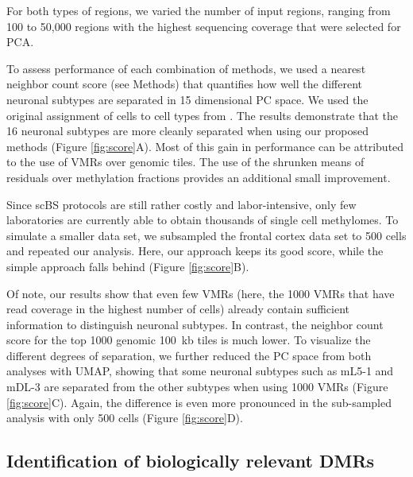\documentclass[twocolumn,10pt]{article}
\begin{document}
For both types of regions, we varied the number of input regions, ranging from 100 to 50,000 regions with the highest sequencing coverage that were selected for PCA.

To assess performance of each combination of methods, we used a nearest neighbor count score (see Methods) that quantifies how well the different neuronal subtypes are separated in 15 dimensional PC space.
We used the original assignment of cells to cell types from \citet{luo2017single}.
The results demonstrate that the 16 neuronal subtypes are more cleanly separated when using our proposed methods (Figure \ref{fig:score}A).
Most of this gain in performance can be attributed to the use of VMRs over genomic tiles.
The use of the shrunken means of residuals over methylation fractions provides an additional small improvement.

Since scBS protocols are still rather costly and labor-intensive, only few laboratories are currently able to obtain thousands of single cell methylomes.
To simulate a smaller data set, we subsampled the frontal cortex data set to 500 cells and repeated our analysis.
Here, our approach keeps its good score, while the simple approach falls behind (Figure \ref{fig:score}B).

Of note, our results show that even few VMRs (here, the 1000 VMRs that have read coverage in the highest number of cells) already contain sufficient information to distinguish neuronal subtypes.
In contrast, the neighbor count score for the top 1000 genomic 100~kb tiles is much lower.
To visualize the different degrees of separation, we further reduced the PC space from both analyses with UMAP, showing that some neuronal subtypes such as mL5-1 and mDL-3 are separated from the other subtypes when using 1000 VMRs (Figure \ref{fig:score}C).
Again, the difference is even more pronounced in the sub-sampled analysis with only 500 cells (Figure \ref{fig:score}D).

\subsection{Identification of biologically relevant DMRs}
\end{document}

